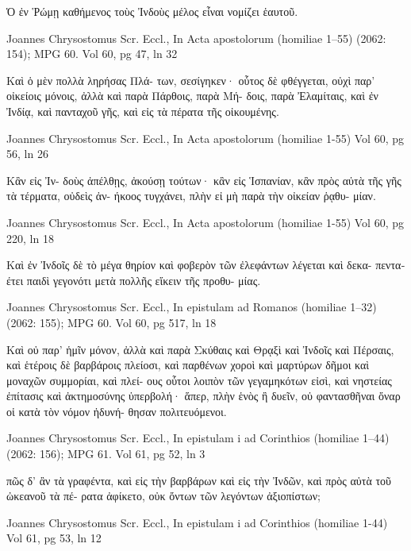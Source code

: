 \documentclass[12pt,letterpaper,twoside,final]{memoir}
\begin{document}
\begin{greek}
                                                      Ὁ ἐν 
Ῥώμῃ καθήμενος τοὺς Ἰνδοὺς μέλος εἶναι νομίζει    
ἑαυτοῦ. 



Joannes Chrysostomus Scr. Eccl., In Acta apostolorum (homiliae 1–55) (2062: 154); MPG 60.
Vol 60, pg 47, ln 32

                      Καὶ ὁ μὲν πολλὰ ληρήσας Πλά-
των, σεσίγηκεν· οὗτος δὲ φθέγγεται, οὐχὶ παρ' 
οἰκείοις μόνοις, ἀλλὰ καὶ παρὰ Πάρθοις, παρὰ Μή-
δοις, παρὰ Ἐλαμίταις, καὶ ἐν Ἰνδίᾳ, καὶ πανταχοῦ 
γῆς, καὶ εἰς τὰ πέρατα τῆς οἰκουμένης. 



Joannes Chrysostomus Scr. Eccl., In Acta apostolorum (homiliae 1-55) 
Vol 60, pg 56, ln 26

                                      Κἂν εἰς Ἰν-
δοὺς ἀπέλθῃς, ἀκούσῃ τούτων· κἂν εἰς Ἱσπανίαν, 
κἂν πρὸς αὐτὰ τῆς γῆς τὰ τέρματα, οὐδεὶς ἀν-
ήκοος τυγχάνει, πλὴν εἰ μὴ παρὰ τὴν οἰκείαν ῥᾳθυ-
μίαν. 



Joannes Chrysostomus Scr. Eccl., In Acta apostolorum (homiliae 1-55) 
Vol 60, pg 220, ln 18

                                     Καὶ ἐν Ἰνδοῖς δὲ τὸ μέγα 
θηρίον καὶ φοβερὸν τῶν ἐλεφάντων λέγεται καὶ δεκα-
πενταέτει παιδὶ γεγονότι μετὰ πολλῆς εἴκειν τῆς προθυ-
μίας. 



Joannes Chrysostomus Scr. Eccl., In epistulam ad Romanos (homiliae 1–32) (2062: 155); MPG 60.
Vol 60, pg 517, ln 18

                         Καὶ οὐ παρ' ἡμῖν μόνον, ἀλλὰ 
καὶ παρὰ Σκύθαις καὶ Θρᾳξὶ καὶ Ἰνδοῖς καὶ Πέρσαις, 
καὶ ἑτέροις δὲ βαρβάροις πλείοσι, καὶ παρθένων χοροὶ 
καὶ μαρτύρων δῆμοι καὶ μοναχῶν συμμορίαι, καὶ πλεί-
ους οὗτοι λοιπὸν τῶν γεγαμηκότων εἰσὶ, καὶ νηστείας 
ἐπίτασις καὶ ἀκτημοσύνης ὑπερβολή· ἅπερ, πλὴν ἑνὸς 
ἢ δυεῖν, οὐ φαντασθῆναι ὄναρ οἱ κατὰ τὸν νόμον ἠδυνή-
θησαν πολιτευόμενοι. 



Joannes Chrysostomus Scr. Eccl., In epistulam i ad Corinthios (homiliae 1–44) (2062: 156); MPG 61.
Vol 61, pg 52, ln 3

πῶς δ' ἂν τὰ γραφέντα, καὶ εἰς τὴν βαρβάρων καὶ 
εἰς τὴν Ἰνδῶν, καὶ πρὸς αὐτὰ τοῦ ὠκεανοῦ τὰ πέ-
ρατα ἀφίκετο, οὐκ ὄντων τῶν λεγόντων ἀξιοπίστων; 



Joannes Chrysostomus Scr. Eccl., In epistulam i ad Corinthios (homiliae 1-44) 
Vol 61, pg 53, ln 12


\end{greek}
\end{document}
